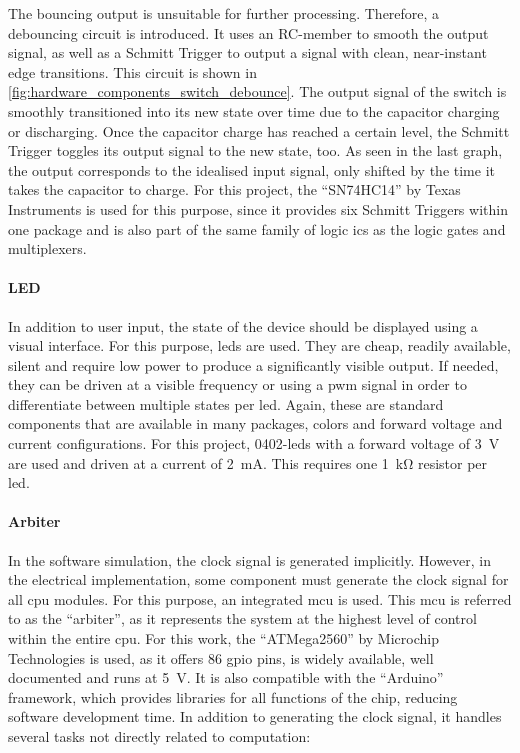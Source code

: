 The bouncing output is unsuitable for further processing. Therefore, a debouncing circuit is introduced. It uses an RC-member to smooth the output signal, as well as a Schmitt Trigger to output a signal with clean, near-instant edge transitions. This circuit is shown in \autoref{fig:hardware_components_switch_debounce}. The output signal of the switch is smoothly transitioned into its new state over time due to the capacitor charging or discharging. Once the capacitor charge has reached a certain level, the Schmitt Trigger toggles its output signal to the new state, too. As seen in the last graph, the output corresponds to the idealised input signal, only shifted by the time it takes the capacitor to charge. For this project, the ``SN74HC14'' by Texas Instruments is used for this purpose, since it provides six Schmitt Triggers within one package and is also part of the same family of logic \acp{ic} as the logic gates and multiplexers.

\paragraph*{LED}

In addition to user input, the state of the device should be displayed using a visual interface. For this purpose, \acp{led} are used. They are cheap, readily available, silent and require low power to produce a significantly visible output. If needed, they can be driven at a visible frequency or using a \ac{pwm} signal in order to differentiate between multiple states per \ac{led}. Again, these are standard components that are available in many packages, colors and forward voltage and current configurations. For this project, 0402-\acp{led} with a forward voltage of \SI{3}{\volt} are used and driven at a current of \SI{2}{\milli\ampere}. This requires one \SI{1}{\kilo\ohm} resistor per \ac{led}.

\paragraph*{Arbiter}

In the software simulation, the clock signal is generated implicitly. However, in the electrical implementation, some component must generate the clock signal for all \ac{cpu} modules. For this purpose, an integrated \ac{mcu} is used. This \ac{mcu} is referred to as the ``arbiter'', as it represents the system at the highest level of control within the entire \ac{cpu}. For this work, the ``ATMega2560'' by Microchip Technologies is used, as it offers 86 \ac{gpio} pins, is widely available, well documented and runs at \SI{5}{\volt}. It is also compatible with the ``Arduino'' framework, which provides libraries for all functions of the chip, reducing software development time. In addition to generating the clock signal, it handles several tasks not directly related to computation:

